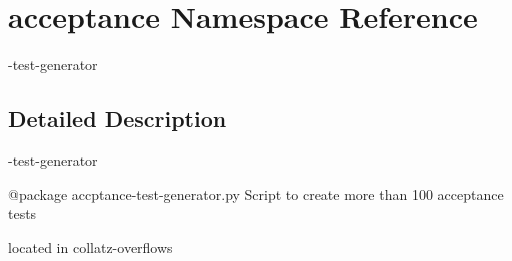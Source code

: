 \hypertarget{namespaceacceptance}{\section{acceptance Namespace Reference}
\label{namespaceacceptance}
}


-\/test-\/generator  




\subsection{Detailed Description}
-\/test-\/generator \begin{DoxyVerb}@package accptance-test-generator.py
Script to create more than 100 acceptance tests
 
located in collatz-overflows
\end{DoxyVerb}
 